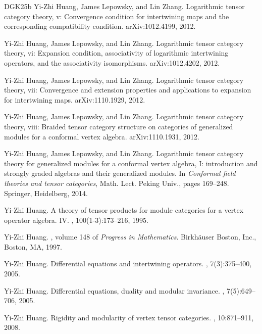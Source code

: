 \documentclass[11pt,b5paper,notitlepage]{article}
\theoremstyle{definition}
\theoremstyle{plain}
\newcommand{\<}{\left\langle}
\renewcommand{\>}{\right\rangle}
\numberwithin{equation}{section}
\begin{document}
\begin{thebibliography}{DGK25b}
Yi-Zhi Huang, James Lepowsky, and Lin Zhang.
\newblock Logarithmic tensor category theory, v: Convergence condition for
  intertwining maps and the corresponding compatibility condition.
\newblock arXiv:1012.4199, 2012.

Yi-Zhi Huang, James Lepowsky, and Lin Zhang.
\newblock Logarithmic tensor category theory, vi: Expansion condition,
  associativity of logarithmic intertwining operators, and the associativity
  isomorphisms.
\newblock arXiv:1012.4202, 2012.

Yi-Zhi Huang, James Lepowsky, and Lin Zhang.
\newblock Logarithmic tensor category theory, vii: Convergence and extension
  properties and applications to expansion for intertwining maps.
\newblock arXiv:1110.1929, 2012.

Yi-Zhi Huang, James Lepowsky, and Lin Zhang.
\newblock Logarithmic tensor category theory, viii: Braided tensor category
  structure on categories of generalized modules for a conformal vertex
  algebra.
\newblock arXiv:1110.1931, 2012.

Yi-Zhi Huang, James Lepowsky, and Lin Zhang.
\newblock Logarithmic tensor category theory for generalized modules for a
  conformal vertex algebra, {I}: introduction and strongly graded algebras and
  their generalized modules.
\newblock In {\em Conformal field theories and tensor categories}, Math. Lect.
  Peking Univ., pages 169--248. Springer, Heidelberg, 2014.

Yi-Zhi Huang.
\newblock A theory of tensor products for module categories for a vertex
  operator algebra. {IV}.
, 100(1-3):173--216, 1995.

Yi-Zhi Huang.
, volume 148 of {\em Progress in Mathematics}.
\newblock Birkh\"{a}user Boston, Inc., Boston, MA, 1997.

Yi-Zhi Huang.
\newblock Differential equations and intertwining operators.
, 7(3):375--400, 2005.

Yi-Zhi Huang.
\newblock Differential equations, duality and modular invariance.
, 7(5):649--706, 2005.

Yi-Zhi Huang.
\newblock Rigidity and modularity of vertex tensor categories.
, 10:871--911, 2008.


\end{thebibliography}
\end{document}
